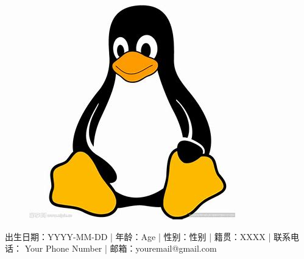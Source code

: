 \documentclass[10pt,A4]{article}
\begin{document}
\pagestyle{fancy}	
\vspace{2pt}



\begin{figure}[H]
	\begin{flushright}
		\includegraphics[width=0.2\linewidth,angle=0,trim=0 0 0 -100,clip]{linux.jpeg}%
	\end{flushright}
\end{figure}
	

\vspace{-175pt}
\begin{center}
	 \small 出生日期：YYYY-MM-DD |
	\small 年龄：Age |
	 \small 性别：性别 |
	 \small 籍贯：XXXX |
	 \small 联系电话： Your Phone Number |
	\small 邮箱：youremail@gmail.com
\end{center}



\vspace{1pt}
\end{document}
